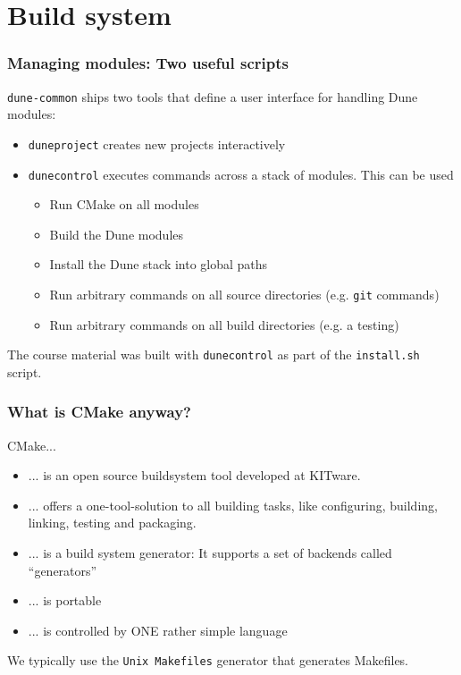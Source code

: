 \documentclass[aspectratio=169,11pt]{beamer}
\theoremstyle{definition}
\begin{document}
\section{Build system}

\begin{frame}[fragile]
  \frametitle{Managing modules: Two useful scripts}

  \lstinline!dune-common! ships two tools that define a user interface
  for handling Dune modules:
  \begin{itemize}
   \item \lstinline!duneproject! creates new projects interactively
   \item \lstinline!dunecontrol! executes commands across a stack of modules. This can be used
     \begin{itemize}
       \item Run CMake on all modules
       \item Build the Dune modules
       \item Install the Dune stack into global paths
       \item Run arbitrary commands on all source directories (e.g. \lstinline!git! commands)
       \item Run arbitrary commands on all build directories (e.g. a testing)
     \end{itemize}
  \end{itemize}

  \vspace{0.5cm}
  The course material was built with \lstinline!dunecontrol! as part of the
  \lstinline!install.sh! script.
\end{frame}

\begin{frame}[fragile]
 \frametitle{What is CMake anyway?}
 CMake...
 \begin{itemize}
  \item ... is an open source buildsystem tool developed at KITware.
  \item ... offers a one-tool-solution to all building tasks, like configuring, building, linking, testing and packaging.
  \item ... is a build system generator: It supports a set of backends called ``generators''
  \item ... is portable
  \item ... is controlled by ONE rather simple language
 \end{itemize}
 \vspace{0.5cm}
 We typically use the \lstinline!Unix Makefiles! generator that generates Makefiles.
\end{frame}
\end{document}
